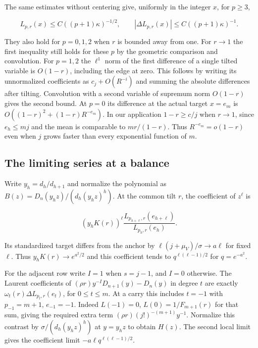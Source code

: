 \documentclass[11pt]{article}
\begin{document}
The same estimates without centering give, uniformly in the integer \(x\), for \(p\ge3\),

\begin{equation*}
L_{p,r}(x)\le C((p+1)\kappa)^{-1/2},\qquad
|\Delta L_{p,r}(x)|\le C((p+1)\kappa)^{-1}.
\end{equation*}

They also hold for \(p=0,1,2\) when \(r\) is bounded away from one. For \(r\to1\) the first inequality still holds for these \(p\) by the geometric comparison and convolution. For \(p=1,2\) the \(\ell^1\) norm of the first difference of a single tilted variable is \(O(1-r)\), including the edge at zero. This follows by writing its unnormalized coefficients as \(c_j+O(R^{-i})\) and summing the absolute differences after tilting. Convolution with a second variable of supremum norm \(O(1-r)\) gives the second bound. At \(p=0\) its difference at the actual target \(x=e_m\) is \(O((1-r)^2+(1-r)R^{-e_m})\). In our application \(1-r\ge c/j\) when \(r\to1\), since \(e_h\le mj\) and the mean is comparable to \(m r/(1-r)\). Thus \(R^{-e_m}=o(1-r)\) even when \(j\) grows faster than every exponential function of \(m\).

\subsection{The limiting series at a balance}
\label{sec:the-limiting-series-at-a-balance}

Write \(y_h=d_h/d_{h+1}\) and normalize the polynomial as \(B(z)=D_n(y_hz)/(d_h(y_hz)^h)\). At the common tilt \(r\), the coefficient of \(z^\ell\) is

\begin{equation*}
(y_hK(r))^\ell\frac{L_{p_{h+\ell},r}(e_{h+\ell})}{L_{p_h,r}(e_h)}.
\end{equation*}

Its standardized target differs from the anchor by \(\ell(j+\mu_V)/\sigma\to a\ell\) for fixed \(\ell\). Thus \(y_hK(r)\to e^{a^2/2}\) and this coefficient tends to \(q^{\ell(\ell-1)/2}\) for \(q=e^{-a^2}\).

For the adjacent row write \(I=1\) when \(s=j-1\), and \(I=0\) otherwise. The Laurent coefficients of \((\rho r)y^{-I}D_{n+1}(y)-D_n(y)\) in degree \(t\) are exactly \(\omega_t(r)\Delta L_{p_t,r}(e_t)\), for \(0\le t\le m\). At a carry this includes \(t=-1\) with \(p_{-1}=m+1\), \(e_{-1}=-1\). Indeed \(L(-1)=0\), \(L(0)=1/F_{m+1}(r)\) for that sum, giving the required extra term \((\rho r)(j!)^{-(m+1)}y^{-1}\). Normalize this contrast by \(\sigma/(d_h(y_h z)^h)\) at \(y=y_hz\) to obtain \(H(z)\). The second local limit gives the coefficient limit \(-a\ell q^{\ell(\ell-1)/2}\).
\end{document}
